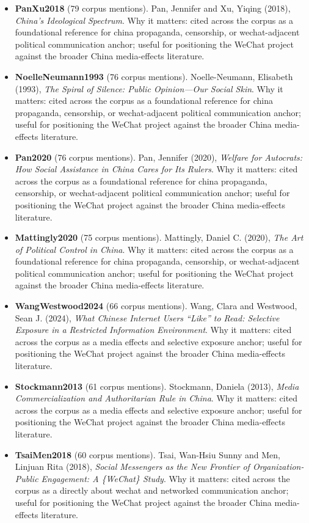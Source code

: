 \documentclass[12pt]{article}
\begin{document}
\begin{itemize}[leftmargin=1.5em]
\item \textbf{PanXu2018} (79 corpus mentions). Pan, Jennifer and Xu, Yiqing (2018), \emph{China's Ideological Spectrum}. Why it matters: cited across the corpus as a foundational reference for china propaganda, censorship, or wechat-adjacent political communication anchor; useful for positioning the WeChat project against the broader China media-effects literature.
\item \textbf{NoelleNeumann1993} (76 corpus mentions). Noelle-Neumann, Elisabeth (1993), \emph{The Spiral of Silence: Public Opinion---Our Social Skin}. Why it matters: cited across the corpus as a foundational reference for china propaganda, censorship, or wechat-adjacent political communication anchor; useful for positioning the WeChat project against the broader China media-effects literature.
\item \textbf{Pan2020} (76 corpus mentions). Pan, Jennifer (2020), \emph{Welfare for Autocrats: How Social Assistance in China Cares for Its Rulers}. Why it matters: cited across the corpus as a foundational reference for china propaganda, censorship, or wechat-adjacent political communication anchor; useful for positioning the WeChat project against the broader China media-effects literature.
\item \textbf{Mattingly2020} (75 corpus mentions). Mattingly, Daniel C. (2020), \emph{The Art of Political Control in China}. Why it matters: cited across the corpus as a foundational reference for china propaganda, censorship, or wechat-adjacent political communication anchor; useful for positioning the WeChat project against the broader China media-effects literature.
\item \textbf{WangWestwood2024} (66 corpus mentions). Wang, Clara and Westwood, Sean J. (2024), \emph{What Chinese Internet Users ``Like'' to Read: Selective Exposure in a Restricted Information Environment}. Why it matters: cited across the corpus as a media effects and selective exposure anchor; useful for positioning the WeChat project against the broader China media-effects literature.
\item \textbf{Stockmann2013} (61 corpus mentions). Stockmann, Daniela (2013), \emph{Media Commercialization and Authoritarian Rule in China}. Why it matters: cited across the corpus as a media effects and selective exposure anchor; useful for positioning the WeChat project against the broader China media-effects literature.
\item \textbf{TsaiMen2018} (60 corpus mentions). Tsai, Wan-Hsiu Sunny and Men, Linjuan Rita (2018), \emph{Social Messengers as the New Frontier of Organization-Public Engagement: A \{WeChat\} Study}. Why it matters: cited across the corpus as a directly about wechat and networked communication anchor; useful for positioning the WeChat project against the broader China media-effects literature.

\end{itemize}
\end{document}
